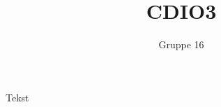 \documentclass[12pt,a4paper]{paper}
\author{Gruppe 16}
\title{CDIO3}
\begin{document}
        \pagebreak
        \pagebreak
    Tekst
    
\end{document}
